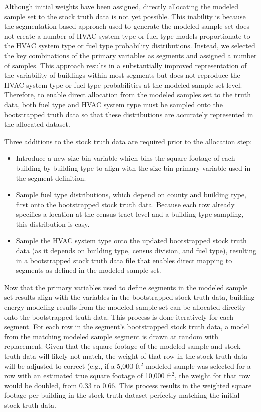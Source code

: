 Although initial weights have been assigned, directly allocating the modeled sample set to the stock truth data is not yet possible. This inability is because the segmentation-based approach used to generate the modeled sample set does not create a number of HVAC system type or fuel type models proportionate to the HVAC system type or fuel type probability distributions. Instead, we selected the key combinations of the primary variables as segments and assigned a number of samples. This approach results in a substantially improved representation of the variability of buildings within most segments but does not reproduce the HVAC system type or fuel type probabilities at the modeled sample set level. Therefore, to enable direct allocation from the modeled samples set to the truth data, both fuel type and HVAC system type must be sampled onto the bootstrapped truth data so that these distributions are accurately represented in the allocated dataset.

Three additions to the stock truth data are required prior to the allocation step:
\begin{itemize}
  \item Introduce a new size bin variable which bins the square footage of each building by building type to align with the size bin primary variable used in the segment definition.
  \item Sample fuel type distributions, which depend on county and building type, first onto the bootstrapped stock truth data. Because each row already specifies a location at the census-tract level and a building type sampling, this distribution is easy.
 \item Sample the HVAC system type onto the updated bootstrapped stock truth data (as it depends on building type, census division, and fuel type), resulting in a bootstrapped stock truth data file that enables direct mapping to segments as defined in the modeled sample set.
\end{itemize}

Now that the primary variables used to define segments in the modeled sample set results align with the variables in the bootstrapped stock truth data, building energy modeling results from the modeled sample set can be allocated directly onto the bootstrapped truth data. This process is done iteratively for each segment. For each row in the segment's bootstrapped stock truth data, a model from the matching modeled sample segment is drawn at random with replacement. Given that the square footage of the modeled sample and stock truth data will likely not match, the weight of that row in the stock truth data will be adjusted to correct (e.g., if a 5,000-ft$^2$-modeled sample was selected for a row with an estimated true square footage of 10,000 ft$^2$, the weight for that row would be doubled, from 0.33 to 0.66. This process results in the weighted square footage per building in the stock truth dataset perfectly matching the initial stock truth data.

